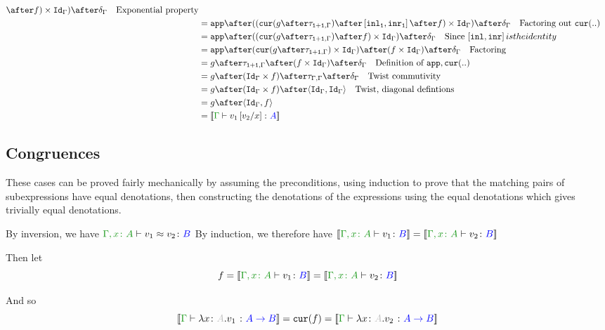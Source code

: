 \documentclass{report}
\begin{document}
\begin{align}
{        }\after f)\times \idg)\after\diag{\G}\qt{Exponential property}\\
        & = \app\after((\cur{g\after\twist{\1+\1}{\G}}\after\fld{
            \inl_\1
        }{
            \inr_\1
        }\after f)\times \idg)\after\diag{\G}\qt{Factoring out $\cur{..}$}\\
        & = \app\after((\cur{g\after\twist{\1+\1}{\G}}\after f)\times \idg)\after\diag{\G}\qt{Since $\fld{\inl}{\inr} is the identity$}\\
        & = \app\after(\cur{g\after\twist{\1+\1}{\G}}\times \idg)\after (f\times \idg)\after\diag{\G}\qt{Factoring}\\
       & = g\after\twist{\1+\1}{\G} \after (f\times \idg)\after\diag{\G} \qt{Definition of $\app,\cur{..}$}\\
       & = g\after(\idg\times f)\after \twist{\G}{\G} \after\diag{\G} \qt{Twist commutivity}\\
       & = g\after(\idg\times f) \after\pr{\idg}{\idg} \qt{Twist, diagonal defintions} \\
       & = g\after\pr{\idg}{f} \\
       & = \deno{\gtyperelation{v_1\ssub{x}{v_2}}{ A}} \\
    \end{align}






\subsection{Congruences}
These cases can be proved fairly mechanically by assuming the preconditions, using induction to prove that the matching pairs of subexpressions have equal denotations, then constructing the denotations of the expressions using the equal denotations which gives trivially equal denotations.

    By inversion, we have $\berelation{\gax}{v_1}{v_2}{B}$
    By induction, we therefore have $\deno{\typerelation{\gax}{v_1}{B}} = \deno{\typerelation{\gax}{v_2}{B}}$

    Then let
    \begin{equation}
        f = \deno{\typerelation{\gax}{v_1}{B}} = \deno{\typerelation{\gax}{v_2}{B}}
    \end{equation}

    And so
    \begin{equation}
        \deno{\gtyperelation{\lam{x}{A}{v_1}}{\ab}} = \cur{f} = \deno{\gtyperelation{\lam{x}{A}{v_2}}{\ab}}
    \end{equation}
\end{document}
